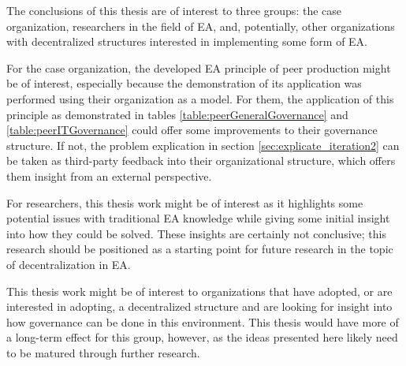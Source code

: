 The conclusions of this thesis are of interest to three groups: the case organization, researchers in the field of EA, and, potentially, other organizations with decentralized structures interested in implementing some form of EA. 

For the case organization, the developed EA principle of peer production might be of interest, especially because the demonstration of its application was performed using their organization as a model. For them, the application of this principle as demonstrated in tables \ref{table:peerGeneralGovernance} and \ref{table:peerITGovernance} could offer some improvements to their governance structure. If not, the problem explication in section \ref{sec:explicate_iteration2} can be taken as third-party feedback into their organizational structure, which offers them insight from an external perspective. 

For researchers, this thesis work might be of interest as it highlights some potential issues with traditional EA knowledge while giving some initial insight into how they could be solved. These insights are certainly not conclusive; this research should be positioned as a starting point for future research in the topic of decentralization in EA. 

This thesis work might be of interest to organizations that have adopted, or are interested in adopting, a decentralized structure and are looking for insight into how governance can be done in this environment. This thesis would have more of a long-term effect for this group, however, as the ideas presented here likely need to be matured through further research.  